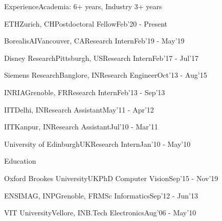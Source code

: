 \documentclass{resume} %
\begin{document}

\begin{paracol}{2}
\setlength{\columnsep}{2em}
\begin{rSection}{Experience}{\quad Academia: 6+ years, Industry 3+ years}
\begin{rSubsection}{ETH}{Zurich, CH}{Postdoctoral Fellow}{Feb'20 - Present}\end{rSubsection}
\begin{rSubsection}{BorealisAI}{Vancouver, CA}{Research Intern}{Feb'19 - May'19}\end{rSubsection}
\begin{rSubsection}{Disney Research}{Pittsburgh, US}{Research Intern}{Feb'17 - Jul'17}\end{rSubsection}
\begin{rSubsection}{Siemens Research}{Banglore, IN}{Research Engineer}{Oct'13 - Aug'15}\end{rSubsection}
\begin{rSubsection}{INRIA}{Grenoble, FR}{Research Intern}{Feb'13 - Sep'13}\end{rSubsection}
\begin{rSubsection}{IIT}{Delhi, IN}{Research Assistant}{May'11 - Apr'12}\end{rSubsection}
\begin{rSubsection}{IIT}{Kanpur, IN}{Research Assistant}{Jul'10 - Mar'11}\end{rSubsection}
\begin{rSubsection}{University of Edinburgh}{UK}{Research Intern}{Jan'10 - May'10}\end{rSubsection}
\end{rSection}

\begin{rSection}{Education}{}
\begin{eSubsection}{Oxford Brookes University}{UK}{PhD Computer Vision}{Sep'15 - Nov'19}\end{eSubsection}
\begin{eSubsection}{ENSIMAG, INP}{Grenoble, FR}{MSc Informatics}{Sep'12 - Jun'13}\end{eSubsection}
\begin{eSubsection}{VIT University}{Vellore, IN}{B.Tech Electronics}{Aug'06 - May'10}\end{eSubsection} 
\end{rSection}



\end{paracol}
\end{document}
